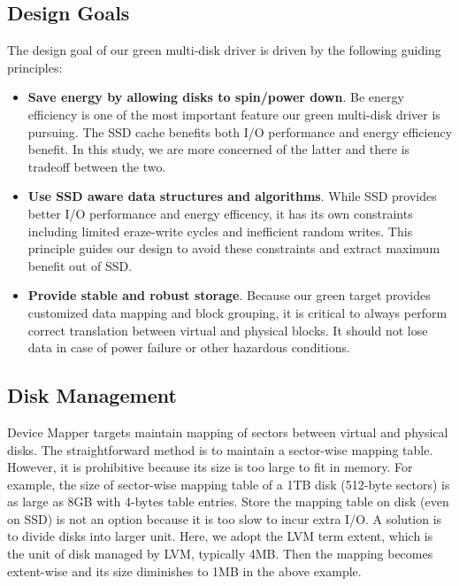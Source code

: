 \subsection{Design Goals}
The design goal of our green multi-disk driver is driven by the
following guiding principles: 

\begin{itemize}
\item \textbf{Save energy by allowing disks to spin/power down}. Be
energy efficiency is one of the most important feature our green
multi-disk driver is pursuing. The SSD cache benefits both I/O
performance and energy efficiency benefit. In this study, we are more
concerned of the latter and there is tradeoff between the two. 

\item \textbf{Use SSD aware data structures and algorithms}. While SSD
provides better I/O performance and energy efficency, it has its own
constraints including limited eraze-write cycles and inefficient
random writes. This principle guides our design to avoid these
constraints and extract maximum benefit out of SSD.

\item \textbf{Provide stable and robust storage}. Because our green
target provides customized data mapping and block grouping, it is
critical to always perform correct translation between virtual and
physical blocks. It should not lose data in case of power failure or
other hazardous conditions.
\end{itemize}

\subsection{Disk Management}

Device Mapper targets maintain mapping of sectors between virtual and
physical disks. The straightforward method is to maintain a
sector-wise mapping table. However, it is prohibitive because its size
is too large to fit in memory. For example, the size of sector-wise
mapping table of a 1TB disk (512-byte sectors) is as large as 8GB with
4-bytes table entries. Store the mapping table on disk (even on SSD)
is not an option because it is too slow to incur extra I/O. A solution
is to divide disks into larger unit. Here, we adopt the LVM term
extent, which is the unit of disk managed by LVM, typically 4MB. Then
the mapping becomes extent-wise and its size diminishes to 1MB in the
above example. 

